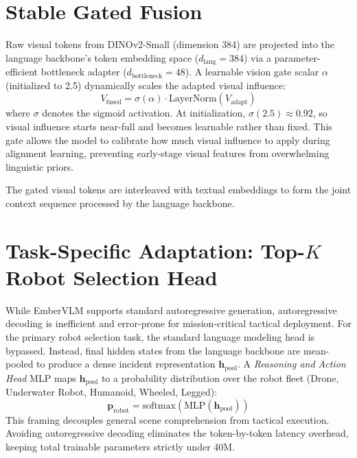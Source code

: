 \section{Stable Gated Fusion}
\label{sec:embervlm_fusion}

Raw visual tokens from DINOv2-Small (dimension 384) are projected into the language backbone's token embedding space ($d_{\text{lang}}{=}384$) via a parameter-efficient bottleneck adapter ($d_{\text{bottleneck}}{=}48$). A learnable vision gate scalar $\alpha$ (initialized to 2.5) dynamically scales the adapted visual influence:
\begin{equation}
    V_{\text{fused}} = \sigma(\alpha) \cdot \mathrm{LayerNorm}(V_{\text{adapt}})
    \label{eq:embervlm_gate}
\end{equation}
where $\sigma$ denotes the sigmoid activation. At initialization, $\sigma(2.5) \approx 0.92$, so visual influence starts near-full and becomes learnable rather than fixed. This gate allows the model to calibrate how much visual influence to apply during alignment learning, preventing early-stage visual features from overwhelming linguistic priors.

The gated visual tokens are interleaved with textual embeddings to form the joint context sequence processed by the language backbone.

\section{Task-Specific Adaptation: Top-$K$ Robot Selection Head}
\label{sec:embervlm_head}

While EmberVLM supports standard autoregressive generation, autoregressive decoding is inefficient and error-prone for mission-critical tactical deployment. For the primary robot selection task, the standard language modeling head is bypassed. Instead, final hidden states from the language backbone are mean-pooled to produce a dense incident representation $\mathbf{h}_{\text{pool}}$. A \textit{Reasoning and Action Head} MLP maps $\mathbf{h}_{\text{pool}}$ to a probability distribution over the robot fleet (Drone, Underwater Robot, Humanoid, Wheeled, Legged):
\begin{equation}
    \mathbf{p}_{\text{robot}} = \mathrm{softmax}\!\left(\mathrm{MLP}(\mathbf{h}_{\text{pool}})\right)
\end{equation}
This framing decouples general scene comprehension from tactical execution. Avoiding autoregressive decoding eliminates the token-by-token latency overhead, keeping total trainable parameters strictly under 40M.

